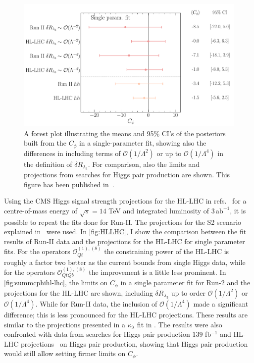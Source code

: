 	\begin{figure}
		\begin{center}
			\includegraphics[width=0.75\linewidth]{fig/uebeblick_forest_cphi_singleparam}
		\end{center}
		\caption{A forest plot illustrating the means and 95\% CI's of the posteriors built from the  $C_\phi$  in a single-parameter fit, showing also the differences in including terms of $\mathcal{O}(1/\Lambda^2)$ or up to $\mathcal{O}(1/\Lambda^4)$ in the definition of $\delta R_{\lambda_3}$. For comparison, also the limits and projections from searches for Higgs pair production are shown. This figure has been published in~\cite{Alasfar:2022zyr}.  \label{fig:summcphihl-lhc}  }
	\end{figure}
	Using the CMS Higgs signal strength projections for the HL-LHC in refs.~\cite{CMS-PAS-FTR-18-011,twiki} for a centre-of-mass energy of $\sqrt{s}=14$ TeV and integrated luminosity of $ 3\, \mathrm{ab}^{-1}$, it is possible to repeat the fits done for Run-II.   The projections for the S2 scenario explained in~\cite{Cepeda:2019klc} were used. 
	In \autoref{fig:HLLHC}, I show the comparison between the fit results of Run-II data and the projections for the HL-LHC for single parameter fits. For the operators $\mathcal{O}_{Qt}^{(1),(8)}$ the constraining power of the HL-LHC is roughly a factor two better as the current bounds from single Higgs data, while for the operators $\mathcal{O}_{QtQb}^{(1),(8)}$ the improvement is a little less prominent.
	 In \autoref{fig:summcphihl-lhc}, the limits on $C_{\phi}$ in a single parameter fit for Run-2 and the projections for the HL-LHC are shown,
	including  $\delta R_{\lambda_3}$ up to order $\mathcal{O}(1/\Lambda^2)$ or $\mathcal{O}(1/\Lambda^4)$. While for Run-II data, the inclusion of $\mathcal{O}(1/\Lambda^4)$ made a significant difference; this is less pronounced for the HL-LHC projections. These results are similar to the projections presented in a $\kappa_{\lambda}$ fit in \cite{DiMicco:2019ngk}. 
	The results were also confronted with data from searches for Higgs pair production $139$ fb$^{-1}$ \cite{ATLAS:2021jki}  and HL-LHC projections~\cite{CMS:2018ccd} on Higgs pair production, showing that Higgs pair production would still allow setting firmer limits on $C_{\phi}$. 
